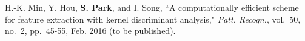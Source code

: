 \documentclass[master,english,final]{kaist-ucs}
\begin{document}
	\begin{publication}
		\item H.-K. Min, Y. Hou, {\bf S. Park}, and I. Song,
		``A computationally efficient scheme for feature extraction with kernel discriminant analysis,"
		\textit{Patt. Recogn.}, vol.~50, no.~2, pp.~45-55, Feb. 2016 (to be published).
	\end{publication}

	\label{paperlastpagelabel}     %
\end{document}
